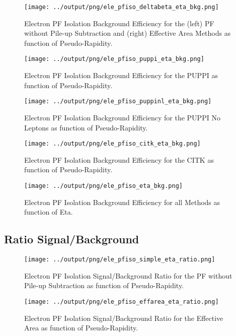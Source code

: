 \documentclass[11pt]{book}
\begin{document}
\begin{figure}[htb]
\centering
\texttt{[image: ../output/png/ele\_pfiso\_deltabeta\_eta\_bkg.png]}
\caption{Electron PF Isolation Background Efficiency for the (left) PF without Pile-up Subtraction and (right) Effective Area Methods as function of Pseudo-Rapidity.}
\label{fig:ele_pfiso_eta_bkg_deltabeta}
\end{figure}

\begin{figure}[htb]
\centering
\texttt{[image: ../output/png/ele\_pfiso\_puppi\_eta\_bkg.png]}
\caption{Electron PF Isolation Background Efficiency for the PUPPI as function of Pseudo-Rapidity.}
\label{fig:ele_pfiso_eta_bkg_puppi}
\end{figure}

\begin{figure}[htb]
\centering
\texttt{[image: ../output/png/ele\_pfiso\_puppinl\_eta\_bkg.png]}
\caption{Electron PF Isolation Background Efficiency for the PUPPI No Leptons as function of Pseudo-Rapidity.}
\label{fig:ele_pfiso_eta_bkg_puppinl}
\end{figure}

\begin{figure}[htb]
\centering
\texttt{[image: ../output/png/ele\_pfiso\_citk\_eta\_bkg.png]}
\caption{Electron PF Isolation Background Efficiency for the CITK as function of Pseudo-Rapidity.}
\label{fig:ele_pfiso_eta_bkg_citk}
\end{figure}

\begin{figure}[htb]
\centering
\texttt{[image: ../output/png/ele\_pfiso\_eta\_bkg.png]}
\caption{Electron PF Isolation Background Efficiency for all Methods as function of Eta.}
\label{fig:ele_pfiso_eta_bkg}
\end{figure}
\clearpage

\subsection{Ratio Signal/Background}
\begin{figure}[htb]
\centering
\texttt{[image: ../output/png/ele\_pfiso\_simple\_eta\_ratio.png]}
\caption{Electron PF Isolation Signal/Background Ratio for the PF without Pile-up Subtraction as function of Pseudo-Rapidity.}
\label{fig:ele_pfiso_eta_ratio_simple}
\end{figure}


\begin{figure}[htb]
\centering
\texttt{[image: ../output/png/ele\_pfiso\_effarea\_eta\_ratio.png]}
\caption{Electron PF Isolation Signal/Background Ratio for the Effective Area as function of Pseudo-Rapidity.}
\label{fig:ele_pfiso_eta_ratio_effarea}
\end{figure}
\end{document}
